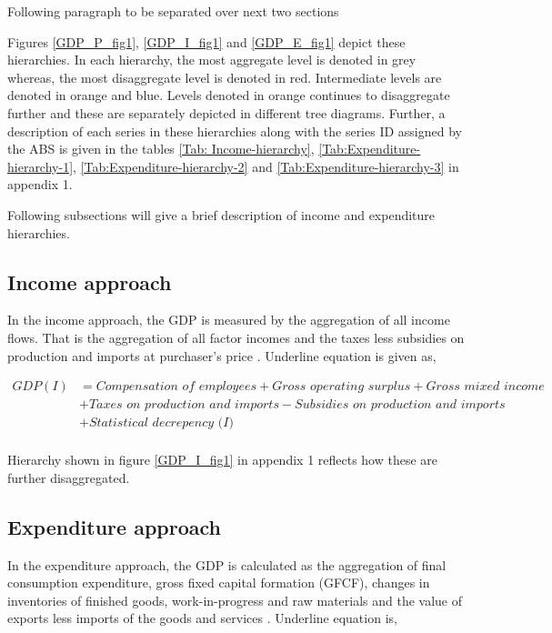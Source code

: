 \documentclass[graybox]{svmult}
\begin{document}
{\color{red} Following paragraph to be separated over next two sections}

Figures \ref{GDP_P_fig1}, \ref{GDP_I_fig1} and \ref{GDP_E_fig1} depict these hierarchies. In each hierarchy, the most aggregate level is denoted in grey whereas, the most disaggregate level is denoted in red.  Intermediate levels are denoted in orange and blue. Levels denoted in orange continues to disaggregate further and these are separately depicted in different tree diagrams. Further, a description of each series in these hierarchies along with the series ID assigned by the ABS is given in the tables \ref{Tab: Income-hierarchy}, \ref{Tab:Expenditure-hierarchy-1}, \ref{Tab:Expenditure-hierarchy-2} and \ref{Tab:Expenditure-hierarchy-3} in appendix 1.





Following subsections will give a brief description of income and expenditure hierarchies.

\subsection{Income approach}

In the income approach, the GDP is measured by the aggregation of all income flows. That is the aggregation of all factor incomes  and the taxes less subsidies on production and imports at purchaser's price \citep{ABS2015}. Underline equation is given as,
\begin{small}
	\begin{align*}
	GDP(I) &= \textit{Compensation of employees} + \textit{Gross operating surplus} + \textit{Gross mixed income}\\ &+ \textit{Taxes on production and imports} - \textit{Subsidies on production and imports}\\ &+ \textit{Statistical decrepency (I)}\\
	\end{align*}
\end{small}
Hierarchy shown in figure \ref{GDP_I_fig1} in appendix 1 reflects how these are further disaggregated.

\subsection{Expenditure approach}

In the expenditure approach, the GDP is calculated as the aggregation of final consumption expenditure, gross fixed capital formation (GFCF), changes in inventories of finished goods, work-in-progress and raw materials and the value of exports less imports of the goods and services \citep{ABS2015}. Underline equation is,
\end{document}
